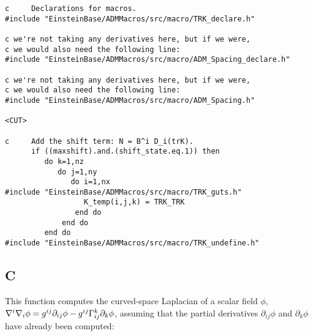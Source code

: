 \newpage	%
\begin{verbatim}
c     Declarations for macros.
#include "EinsteinBase/ADMMacros/src/macro/TRK_declare.h"

c we're not taking any derivatives here, but if we were,
c we would also need the following line:
#include "EinsteinBase/ADMMacros/src/macro/ADM_Spacing_declare.h"

c we're not taking any derivatives here, but if we were,
c we would also need the following line:
#include "EinsteinBase/ADMMacros/src/macro/ADM_Spacing.h"

<CUT>

c     Add the shift term: N = B^i D_i(trK).
      if ((maxshift).and.(shift_state.eq.1)) then
         do k=1,nz
            do j=1,ny
               do i=1,nx
#include "EinsteinBase/ADMMacros/src/macro/TRK_guts.h"
                  K_temp(i,j,k) = TRK_TRK
                end do
             end do
         end do
#include "EinsteinBase/ADMMacros/src/macro/TRK_undefine.h"
\end{verbatim}

\subsection{C}

This function computes the curved-space Laplacian of a scalar field $\phi$,
$\nabla^i \nabla_i \phi
	= g^{ij} \partial_{ij} \phi - g^{ij} \Gamma^k_{ij} \partial_k \phi$,
assuming that the partial derivatives $\partial_{ij} \phi$ and $\partial_k \phi$
have already been computed:

